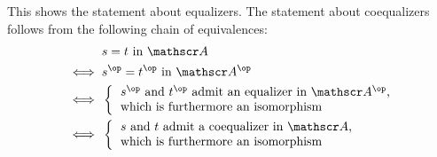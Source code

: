 This shows the statement about equalizers.
The statement about coequalizers follows from the following chain of equivalences:
\begin{align*}
	{}&
	\text{$s = t$ in~$\cat{A}$}
	\\
	\iff{}&
	\text{$s^{\op} = t^{\op}$ in~$\cat{A}^{\op}$}
	\\
	\iff{}&
	\left\lbrace
		\begin{tabular}{l@{}}
			$s^{\op}$ and~$t^{\op}$ admit an equalizer in~$\cat{A}^{\op}$, \\
			which is furthermore an isomorphism
		\end{tabular}
	\right.
	\\
	\iff{}&
	\left\lbrace
		\begin{tabular}{l@{}}
			$s$ and~$t$ admit a coequalizer in~$\cat{A}$, \\
			which is furthermore an isomorphism
		\end{tabular}
	\right.
\end{align*}
